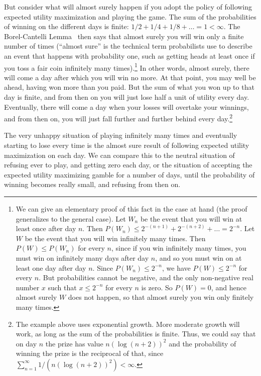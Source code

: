 But consider what will almost surely happen if you adopt the policy of following expected utility maximization and playing the game. The sum of the probabilities of winning on the different days is finite: 
$1/2+1/4+1/8+\dots=1<\infty$. The Borel-Cantelli Lemma~\parencite[Thm.~4.2.1]{ChungProbability} then says that almost surely you will win only a finite number of times
(``almost sure'' is the technical term probabilists use to describe an event that happens with probability one, such as 
getting heads at least once if you toss a fair coin infinitely many times).\footnote{We 
can give an elementary proof of this fact in the case at hand (the proof generalizes to the general case). Let $W_n$ be the event that you will win at least once after day $n$. 
Then $P(W_n)\le 2^{-(n+1)}+2^{-(n+2)}+\dots = 2^{-n}$. Let $W$ be the event that you will win infinitely many times. Then $P(W)\le P(W_n)$ for
every $n$, since if you win infinitely many times, you must win on infinitely many days after day $n$, and so you must win on at least one
day after day $n$. Since $P(W_n) \le 2^{-n}$, we have $P(W) \le 2^{-n}$ for every $n$. But probabilities cannot be negative, and the only 
non-negative real number $x$ such that $x \le 2^{-n}$ for every $n$ is zero. So $P(W)=0$, and hence almost surely $W$ does not happen,
so that almost surely you win only finitely many times.} In other words, almost surely, there will come a day after which you will win no more. At that point, you may well be ahead,
having won more than you paid. But the sum of what you won up to that day is finite, and from then on you will just lose half a unit of utility every 
day. Eventually, there will come a day when your losses will overtake your winnings, and from then on, you will just fall further and further
behind every day.\footnote{The example above uses exponential growth. More moderate growth will work, as long as the sum of the probabilities
is finite. Thus, we could say that on day $n$ the prize has value $n (\log (n+2))^2$ and the probability of winning the prize is the reciprocal
of that, since $\sum_{n=1}^\infty 1/(n (\log (n+2))^2)<\infty$.}

The very unhappy situation of playing infinitely many times and eventually starting to lose every time is the almost 
sure result of following expected utility maximization on each day. We can compare this to the neutral situation of 
refusing ever to play, and getting zero each day, or the situation of accepting the expected utility maximizing gamble
for a number of days, until the probability of winning becomes really small, and refusing from then on.

